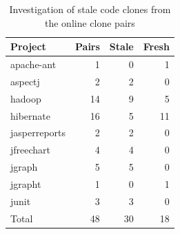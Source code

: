 \documentclass{sig-alternate-05-2015}
\begin{document}
\begin{table}[H]
	\centering
	\caption{Investigation of stale code clones from the online clone pairs}
	\label{tab:stale_code}
	\begin{tabular}{l|r|r|r}
		\hline 
		Project & Pairs & Stale & Fresh \\
		\hline
		apache-ant & 1 & 0 & 1 \\
		aspectj & 2 & 2 & 0 \\
		hadoop & 14 & 9 & 5 \\
		hibernate & 16 & 5 & 11 \\
		jasperreports & 2 & 2 & 0 \\
		jfreechart & 4 & 4 & 0 \\
		jgraph & 5 & 5 & 0 \\
		jgrapht & 1 & 0 & 1 \\
		junit & 3 & 3 & 0 \\
		\hline
		Total & 48 & 30 & 18 \\
		\hline
	\end{tabular} 
\end{table}
\end{document}
